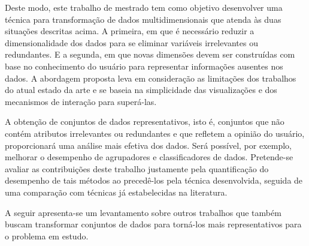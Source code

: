 Deste modo, este trabalho de mestrado tem como objetivo
desenvolver uma técnica para transformação de dados
multidimensionais que atenda às duas situações descritas
acima. A primeira, em que é necessário reduzir a
dimensionalidade dos dados para se eliminar variáveis
irrelevantes ou redundantes. E a segunda, em que novas
dimensões devem ser construídas com base no conhecimento do
usuário para representar informações ausentes nos dados. A
abordagem proposta leva em consideração as limitações dos
trabalhos do atual estado da arte e se baseia na
simplicidade das visualizações e dos mecanismos de interação
para superá-las. 

A obtenção de conjuntos de dados representativos, isto é,
conjuntos que não contém atributos irrelevantes ou
redundantes e que refletem a opinião do usuário,
proporcionará uma análise mais efetiva dos dados. Será
possível, por exemplo, melhorar o desempenho de agrupadores
e classificadores de dados. Pretende-se avaliar as
contribuições deste trabalho justamente pela quantificação
do desempenho de tais métodos ao precedê-los pela técnica
desenvolvida, seguida de uma comparação com técnicas já
estabelecidas na literatura.

A seguir apresenta-se um levantamento sobre outros trabalhos
que também buscam transformar conjuntos de dados para
torná-los mais representativos para o problema em estudo. 
